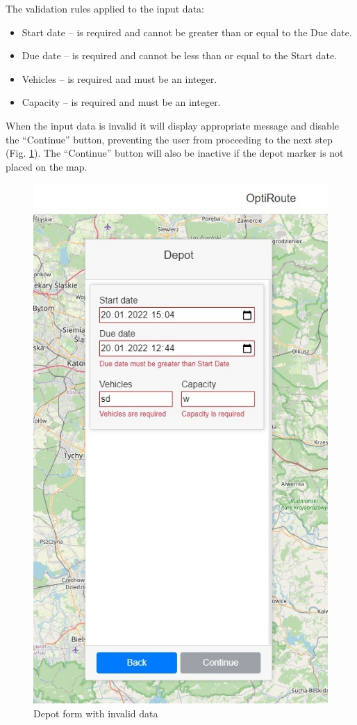 \documentclass[a4paper,twoside,12pt]{book}
\begin{document}
The validation rules applied to the input data:
\begin{itemize}
    \item Start date -- is required and cannot be greater than or equal to the Due date.
    \item Due date -- is required and cannot be less than or equal to the Start date.
    \item Vehicles -- is required and must be an integer.
    \item Capacity -- is required and must be an integer.
\end{itemize}
When the input data is invalid it will display appropriate message and disable the ``Continue'' button, preventing the user from proceeding to the next step (Fig. \ref{fig:invalidDepot}). The ``Continue'' button will also be inactive if the depot marker is not placed on the map.
\begin{figure}[htb]
\centering
\includegraphics[scale=0.7]{images/invalidDepot_updated.jpg}
\caption{Depot form with invalid data}
\label{fig:invalidDepot}
\end{figure}
\end{document}
